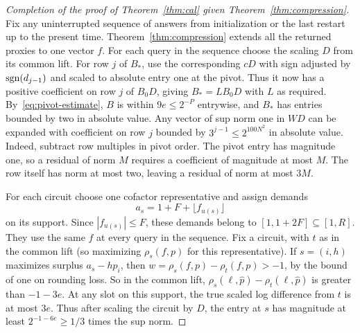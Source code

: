 \begin{proof}[Completion of the proof of Theorem~\ref{thm:cal} given Theorem~\ref{thm:compression}]
Fix any uninterrupted sequence of answers from initialization or the
last restart up to the present time. Theorem~\ref{thm:compression}
extends all the returned proxies to one vector \(f\). For each query
in the sequence choose the scaling \(D\) from its common lift.
For row \(j\) of \(B_*\), use the corresponding \(cD\)
with sign adjusted by \(\operatorname{sgn}(d_{j-1})\)
and scaled to absolute entry one at the pivot.
Thus it now has a positive coefficient on row \(j\)
of \(B_0D\), giving \(B_*=L B_0D\)
with \(L\) as required.
By~\eqref{eq:pivot-estimate}, \(B\) is within \(9e\le2^{-P}\)
entrywise, and \(B_*\)
has entries bounded by two in absolute value.
Any vector of sup norm one in \(WD\)
can be expanded with coefficient on row \(j\)
bounded by \(3^{j-1}\le2^{100N^2}\)
in absolute value. Indeed, subtract row multiples in pivot order.
The pivot entry has magnitude one, so a residual of norm \(M\) requires
a coefficient of magnitude at most \(M\). The row itself has norm at
most two, leaving a residual of norm at most \(3M\).

For each circuit choose one cofactor representative and assign demands
\[
 a_s = 1+F+\lfloor f_{u(s)}\rfloor
\]
on its support. Since \(|f_{u(s)}|\le F\), these demands belong to
\([1,1+2F]\subseteq[1,R]\). They use the same \(f\) at every query in
the sequence.
Fix a circuit, with \(t\) as in the common lift
(so maximizing \(\rho_s(f,p)\) for this representative).
If \(s=(i,h)\) maximizes surplus \(a_s-hp_i\), then
\(w=\rho_s(f,p)-\rho_t(f,p)>-1\),
by the bound of one on rounding loss.
So in the common lift,
\(\rho_s(\ell,\widehat p)-\rho_t(\ell,\widehat p)\)
is greater than \(-1-3e\).
At any slot on this support, the true scaled log difference
from \(t\) is at most \(3e\).
Thus after scaling the circuit by \(D\), the entry at \(s\)
has magnitude at least
\(2^{-1-6e}\ge1/3\) times the sup norm.
\end{proof}
